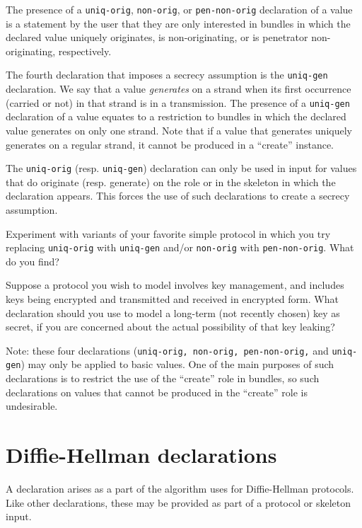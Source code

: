    The
presence of a \texttt{uniq-orig}, \texttt{non-orig}, or
\texttt{pen-non-orig} declaration of a value is a statement by the
user that they are only interested in bundles in which the declared
value uniquely originates, is non-originating, or is penetrator
non-originating, respectively.

  The fourth declaration that
imposes a secrecy assumption is the \texttt{uniq-gen} declaration.  We
say that a value \emph{generates} on a strand when its first
occurrence (carried or not) in that strand is in a transmission.  The
presence of a \texttt{uniq-gen} declaration of a value equates to a
restriction to bundles in which the declared value generates on only
one strand.  Note that if a value that generates uniquely generates on
a regular strand, it cannot be produced in a ``create'' instance.

The \texttt{uniq-orig} (resp. \texttt{uniq-gen}) declaration can only
be used in {\cpsa} input for values that do originate (resp. generate)
on the role or in the skeleton in which the declaration appears.  This
forces the use of such declarations to create a secrecy assumption.

\begin{exercise}
Experiment with variants of your favorite simple protocol in which you
try replacing \texttt{uniq-orig} with \texttt{uniq-gen} and/or
\texttt{non-orig} with \texttt{pen-non-orig}.  What do you find?
\end{exercise}

\begin{exercise}
Suppose a protocol you wish to model involves key management, and
includes keys being encrypted and transmitted and received in
encrypted form.  What declaration should you use to model a long-term
(not recently chosen) key as secret, if you are concerned about the
actual possibility of that key leaking?
\end{exercise}

Note: these four declarations (\texttt{uniq-orig, non-orig,
  pen-non-orig,} and \texttt{uniq-gen}) may only be applied to basic
values.  One of the main purposes of such declarations is to restrict
the use of the ``create'' role in bundles, so such declarations on
values that cannot be produced in the ``create'' role is undesirable.


\section{Diffie-Hellman declarations}
A declaration arises as a part of the algorithm {\cpsa} uses for
Diffie-Hellman protocols.  Like other declarations, these may be
provided as part of a protocol or skeleton input.

